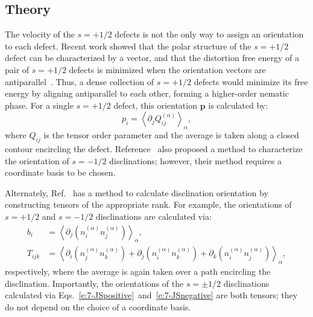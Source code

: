 \subsection{Theory}
The velocity of the $s = +1/2$ defects is not the only way to assign an orientation to each defect.
Recent work showed that the polar structure of the $s = +1/2$ defect can be characterized by a vector, and that the distortion free energy of a pair of $s = +1/2$ defects is minimized when the orientation vectors are antiparallel~\cite{RN6}.
Thus, a dense collection of $s = +1/2$ defects would minimize its free energy by aligning antiparallel to each other, forming a higher-order nematic phase.
For a single $s = +1/2$ defect, this orientation $\mathbf{p}$ is calculated by:
\begin{equation}
  p_i = \left \langle \partial_j Q_{ij}^{(\alpha)} \right \rangle_{\alpha},\label{e:7-LGpositive}
\end{equation}
where $Q_{ij}$ is the tensor order parameter and the average is taken along a closed contour encircling the defect.
Reference~\cite{RN6} also proposed a method to characterize the orientation of $s = -1/2$ disclinations; however, their method requires a coordinate basis to be chosen.

Alternately, Ref.~\cite{jsel} has a method to calculate disclination orientation by constructing tensors of the appropriate rank.
For example, the orientations of $s = +1/2$ and $s = -1/2$ disclinations are calculated via:
\begin{align}
    b_i &= \left \langle \partial_j (n_{i}^{(\alpha)}n_{j}^{(\alpha)}) \right \rangle_{\alpha},\label{e:7-JSpositive} \\
    T_{ijk} &= \left \langle \partial_i (n_{j}^{(\alpha)}n_{k}^{(\alpha)}) + \partial_j (n_{i}^{(\alpha)}n_{k}^{(\alpha)}) + \partial_k (n_{i}^{(\alpha)}n_{j}^{(\alpha)}) \right \rangle_{\alpha},\label{e:7-JSnegative}
\end{align}
respectively, where the average is again taken over a path encircling the disclination.
Importantly, the orientations of the $s = \pm 1/2$ disclinations calculated via Eqs.~\ref{e:7-JSpositive}~and~\ref{e:7-JSnegative} are both tensors; they do not depend on the choice of a coordinate basis.

